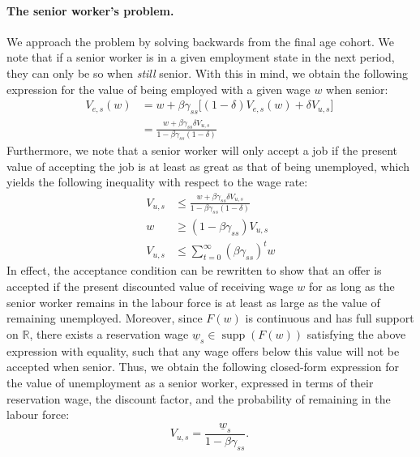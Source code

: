 \documentclass{article}
\newcommand{\lbar}[1]{\underline{#1}} %
\DeclareMathOperator\supp{supp} %
\begin{document}
\paragraph{The senior worker's problem.}
We approach the problem by solving backwards from the final age cohort. We note that if a senior worker is in a given employment state in the next period, they can only be so when \textit{still} senior. With this in mind, we obtain the following expression for the value of being  employed with a given wage $w$ when senior:
\begin{equation}
\begin{aligned}
V_{e,s}(w)&=w+\beta\gamma_{ss}\bigl[(1-\delta)V_{e,s}(w)+\delta V_{u,s}\bigr]\\
&=\frac{w+\beta\gamma_{ss}\delta V_{u,s}}{1-\beta\gamma_{ss}(1-\delta)}
\end{aligned}
~\label{eq:sen_emp_as_umemp}
\end{equation}
Furthermore, we note that a senior worker will only accept a job if the present value of accepting the job is at least as great as that of being unemployed, which yields the following inequality with respect to the wage rate:
\begin{align*}
V_{u,s}&\leq\frac{w+\beta\gamma_{ss}\delta V_{u,s}}{1-\beta\gamma_{ss}(1-\delta)}\\
w&\geq(1-\beta\gamma_{ss})V_{u,s}\\
V_{u,s}&\leq\sum_{t=0}^\infty(\beta\gamma_{ss})^tw
\end{align*}
In effect, the acceptance condition can be rewritten to show that an offer is accepted if the present discounted value of receiving wage $w$ for as long as the senior worker remains in the labour force is at least as large as the value of remaining unemployed. Moreover, since $F(w)$ is continuous and has full support on $\mathbb{R}$, there exists a reservation wage $\lbar{w}_s\in\supp(F(w))$ satisfying the above expression with equality, such that any wage offers below this value will not be accepted when senior. Thus, we obtain the following closed-form expression for the value of unemployment as a senior worker, expressed in terms of their reservation wage, the discount factor, and the probability of remaining in the labour force:
\begin{equation}
V_{u,s}=\frac{\lbar{w}_s}{1-\beta\gamma_{ss}}.
~\label{eq:sen_res_unemp}
\end{equation}
\end{document}
